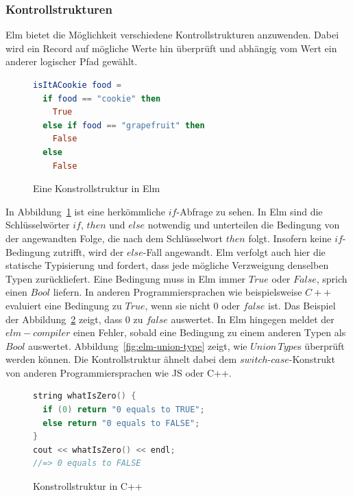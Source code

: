 \subsubsection{Kontrollstrukturen}
\label{sec:Kontrollstrukturen}
Elm bietet die Möglichkeit verschiedene Kontrollstrukturen anzuwenden. Dabei wird ein Record auf mögliche Werte hin überprüft und abhängig vom Wert ein anderer logischer Pfad gewählt.
\begin{figure}[h]
\begin{lstlisting}[language=Elm]
isItACookie food =
  if food == "cookie" then
    True
  else if food == "grapefruit" then
    False
  else
    False
\end{lstlisting}
\caption{Eine Konstrollstruktur in Elm}\label{fig:elm-conditional}
\end{figure}
In Abbildung~\ref{fig:elm-conditional} ist eine herkömmliche $if$-Abfrage zu sehen. In Elm sind die Schlüsselwörter $if$, $then$ und $else$ notwendig und unterteilen die Bedingung von der angewandten Folge, die nach dem Schlüsselwort $then$ folgt. Insofern keine $if$-Bedingung zutrifft, wird der $else$-Fall angewandt.
Elm verfolgt auch hier die statische Typisierung und fordert, dass jede mögliche Verzweigung denselben Typen zurückliefert. Eine Bedingung muss in Elm immer $True$ oder $False$, sprich einen $Bool$ liefern. In anderen Programmiersprachen wie beispielsweise $C++$ evaluiert eine Bedingung zu $True$, wenn sie nicht $0$ oder $false$ ist. Das Beispiel der Abbildung~\ref{fig:cpp-conditional} zeigt, dass $0$ zu $false$ auswertet. In Elm hingegen meldet der $elm-compiler$ einen Fehler, sobald eine Bedingung zu einem anderen Typen als $Bool$ auswertet.
Abbildung~\ref{fig:elm-union-type} zeigt, wie $Union\,Type$s überprüft werden können. Die Kontrollstruktur ähnelt dabei dem $switch$-$case$-Konstrukt von anderen Programmiersprachen wie \ac{JS} oder C++.
\begin{figure}[h]
\begin{lstlisting}[language=cpp]
string whatIsZero() {
  if (0) return "0 equals to TRUE";
  else return "0 equals to FALSE";
}
cout << whatIsZero() << endl;
//=> 0 equals to FALSE

\end{lstlisting}
\caption{Konstrollstruktur in C++}\label{fig:cpp-conditional}
\end{figure}

